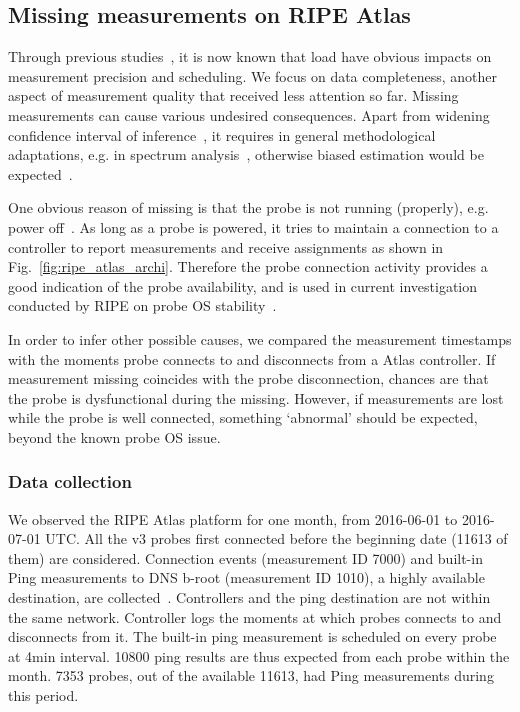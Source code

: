 \subsection{Missing measurements on RIPE Atlas}
\label{sec:miss_atlas}
Through previous studies~\cite{Holterbach2015a, Bajpai2015}, it is now known that load have obvious impacts on measurement precision and scheduling.
We focus on data completeness, another aspect of measurement quality that received less attention so far. Missing measurements can cause various undesired consequences. Apart from widening confidence interval of inference~\cite{Fontugne2016}, it requires in general methodological adaptations, e.g. in spectrum analysis~\cite{Babu2010, Luckie2014, shao2016}, otherwise biased estimation would be expected~\cite{Baraldi2010}.

One obvious reason of missing is that the probe is not running (properly), e.g. power off~\cite{schedule}.
As long as a probe is powered, it tries to maintain a connection to a controller to report measurements and receive assignments as shown in Fig.~\ref{fig:ripe_atlas_archi}. 
Therefore the probe connection activity provides a good indication of the probe availability, and is used in current investigation conducted by RIPE on probe OS stability~\cite{1look, 2look, 3look}.

In order to infer other possible causes, we compared the measurement timestamps with the moments probe connects to and disconnects from a Atlas controller.
If measurement missing coincides with the probe disconnection, chances are that the probe is dysfunctional during the missing. However, if measurements are lost while the probe is well connected, something `abnormal' should be expected, beyond the known probe OS issue.

\subsubsection{Data collection}
We observed the RIPE Atlas platform for one month, from 2016-06-01 to 2016-07-01 UTC.
All the v3 probes first connected before the beginning date (11613 of them) are considered.
Connection events (measurement ID 7000) and built-in Ping measurements to DNS b-root (measurement ID 1010), a highly available destination, are collected~\cite{built-in}. 
Controllers and the ping destination are not within the same network.
Controller logs the moments at which probes connects to and disconnects from it.
The built-in ping measurement is scheduled on every probe at 4min interval. 
10800 ping results are thus expected from each probe within the month.
7353 probes, out of the available 11613, had Ping measurements during this period.

